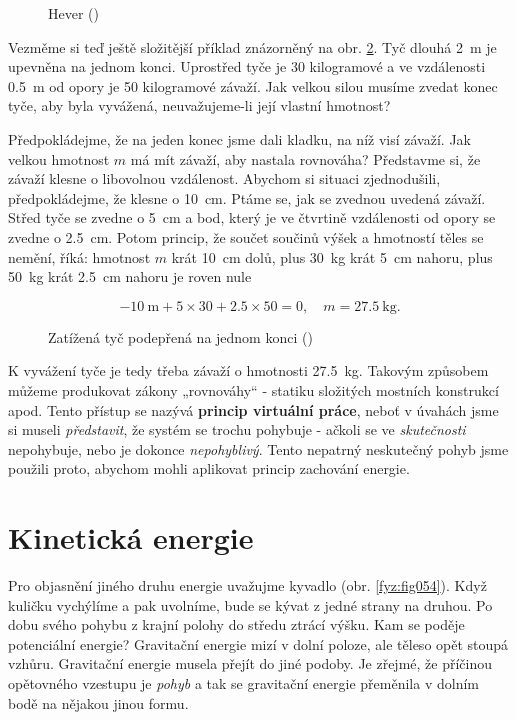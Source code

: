     \begin{figure}[ht!]  %
      \centering
      \caption{Hever (\cite[s.~55]{Feynman01})}
      \label{fyz:fig052}
    \end{figure}

    Vezměme si teď ještě složitější příklad znázorněný na obr. \ref{fyz:fig053}. Tyč dlouhá 
    \SI{2}{\m} je upevněna na jednom konci. Uprostřed tyče je \num{30} kilogramové a ve vzdálenosti 
    \SI{0.5}{\m} od opory je \num{50} kilogramové závaží. Jak velkou silou musíme zvedat konec 
    tyče, aby byla vyvážená, neuvažujeme-li její vlastní hmotnost?
      
    Předpokládejme, že na jeden konec jsme dali kladku, na níž visí závaží. Jak velkou hmotnost 
    \(m\) má mít závaží, aby nastala rovnováha? Představme si, že závaží klesne o libovolnou 
    vzdálenost. Abychom si situaci zjednodušili, předpokládejme, že klesne o \SI{10}{cm}. Ptáme se, 
    jak se zvednou uvedená závaží. Střed tyče se zvedne o \SI{5}{\cm} a bod, který je ve čtvrtině 
    vzdálenosti od opory se zvedne o \SI{2.5}{\cm}. Potom princip, že součet součinů výšek a 
    hmotností těles se nemění, říká: hmotnost \(m\) krát \SI{10}{\cm} dolů, plus \SI{30}{\kg} krát 
    \SI{5}{\cm} nahoru, plus \SI{50}{\kg} krát \SI{2.5}{\cm} nahoru je roven nule
    
    \begin{equation*}
       -\SI{10}{\m} + \num{5}\times\num{30} + \num{2.5}\times\num{50} = \num{0}, 
       \quad m = \SI{27.5}{\kg}.
    \end{equation*}
    \begin{figure}[ht!]  %
      \centering
      \caption{Zatížená tyč podepřená na jednom konci (\cite[s.~56]{Feynman01})}
      \label{fyz:fig053}
    \end{figure}
    K vyvážení tyče je tedy třeba závaží o hmotnosti \SI{27.5}{\kg}. Takovým způsobem můžeme 
    produkovat zákony „rovnováhy“ - statiku složitých mostních konstrukcí apod. Tento přístup se 
    nazývá \textbf{princip virtuální práce}, neboť v úvahách jsme si museli \emph{představit}, že 
    systém se trochu pohybuje - ačkoli se ve \emph{skutečnosti} nepohybuje, nebo je dokonce 
    \emph{nepohyblivý}. Tento nepatrný neskutečný pohyb jsme použili proto, abychom mohli aplikovat 
    princip zachování energie.

  \section{Kinetická energie}
    Pro objasnění jiného druhu energie uvažujme kyvadlo (obr. \ref{fyz:fig054}). Když kuličku 
    vychýlíme a pak uvolníme, bude se kývat z jedné strany na druhou. Po dobu svého pohybu z krajní 
    polohy do středu ztrácí výšku. Kam se poděje potenciální energie? Gravitační energie mizí v 
    dolní poloze, ale těleso opět stoupá vzhůru. Gravitační energie musela přejít do jiné podoby. 
    Je zřejmé, že příčinou opětovného vzestupu je \emph{pohyb} a tak se gravitační energie 
    přeměnila v dolním bodě na nějakou jinou formu.
    
